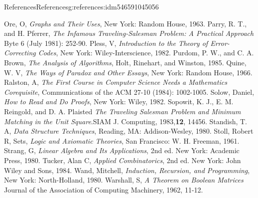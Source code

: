 \documentclass[oneside,10pt,]{book}
\numberwithin{equation}{section}
\begin{document}
\begin{references-chapter-numberless}{References}{}{References}{}{}{g:references:idm546591045056}
\begin{referencelist}
\hypertarget{x:biblio:biblio-ore-1963}{}Ore, O, \textit{Graphs and Their Uses}, New York: Random House, 1963.
\hypertarget{x:biblio:biblio-parry-1981}{}Parry, R. T., and H. Pferrer, \textit{The Infamous Traveling-Salesman Problem: A Practical Approach} Byte 6 (July 1981): 252-90.
\hypertarget{x:biblio:biblio-pless-1982}{}Pless, V, \textit{Introduction to the Theory of Error-Correcting Codes}, New York: Wiley-Interscience, 1982.
\hypertarget{x:biblio:biblio-purdom-1985}{}Purdom, P. W., and C. A. Brown, \textit{The Analysis of Algorithms}, Holt, Rinehart, and Winston, 1985.
\hypertarget{x:biblio:biblio-quine-1966}{}Quine, W. V, \textit{The Ways of Paradox and Other Essays}, New York: Random House, 1966.
\hypertarget{x:biblio:biblio-ralson-1984}{}Ralston, A, \textit{The First Course in Computer Science Needs a Mathematics Corequisite}, Communications of the ACM 27-10 (1984): 1002-1005.
\hypertarget{x:biblio:biblio-solow-1982}{}Solow, Daniel, \textit{How to Read and Do Proofs}, New York: Wiley, 1982.
\hypertarget{x:biblio:biblio-sopowit-1983}{}Sopowit, K. J., E. M. Reingold, and D. A. Plaisted \textit{The Traveling Salesman Problem and Minimum Matching in the Unit Square}.SIAM J. Computing, 1983,\textbf{12}, 144\textendash{}56.
\hypertarget{x:biblio:biblio-standish-1980}{}Standish, T. A, \textit{Data Structure Techniques}, Reading, MA: Addison-Wesley, 1980.
\hypertarget{x:biblio:biblio-stoll-1961}{}Stoll, Robert R, Sets, \textit{Logic and Axiomatic Theories}, San Francisco: W. H. Freeman, 1961.
\hypertarget{x:biblio:biblio-strang-1980}{}Strang, G, \textit{Linear Algebra and Its Applications}, 2nd ed. New York: Academic Press, 1980.
\hypertarget{x:biblio:biblio-tucker-1984}{}Tucker, Alan C, \textit{Applied Combinatorics}, 2nd ed. New York: John Wiley and Sons, 1984.
\hypertarget{x:biblio:biblio-wand-1980}{}Wand, Mitchell, \textit{Induction, Recursion, and Programming}, New York: North-Holland, 1980.
\hypertarget{x:biblio:biblio-warshall-1962}{}Warshall, S, \textit{A Theorem on Boolean Matrices}  Journal of the Association of Computing Machinery, 1962, 11-12.

\end{referencelist}
\end{references-chapter-numberless}
\end{document}
